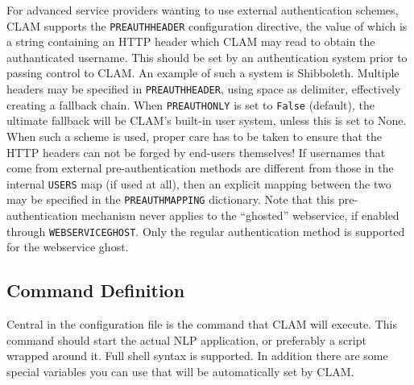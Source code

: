 \documentclass[a4paper,12pt]{report}
\begin{document}
For advanced service providers wanting to use external authentication schemes, CLAM supports the \texttt{PREAUTHHEADER} configuration directive, the value of which is a string containing an HTTP header which CLAM may read to obtain the authanticated username. This should be set by an authentication system prior to passing control to CLAM. An example of such a system is Shibboleth. Multiple headers may be specified in \texttt{PREAUTHHEADER}, using space as delimiter, effectively creating a fallback chain. When \texttt{PREAUTHONLY} is set to \texttt{False} (default), the ultimate fallback will be CLAM's built-in user system, unless this is set to None. When such a scheme is used, proper care has to be taken to ensure that the HTTP headers can not be forged by end-users themselves! If usernames that come from external pre-authentication methods are different from those in the internal \texttt{USERS} map (if used at all), then an explicit mapping between the two may be specified in the \texttt{PREAUTHMAPPING} dictionary. Note that this pre-authentication mechanism never applies to the ``ghosted'' webservice, if enabled through \texttt{WEBSERVICEGHOST}. Only the regular authentication method is supported for the webservice ghost.

\subsection{Command Definition}
\label{sec:command}

Central in the configuration file is the command that CLAM will execute. This command should start the actual NLP application, or preferably a script wrapped around it. Full shell syntax is supported. In addition there are some special variables you can use that will be automatically set by CLAM. 
\end{document}
